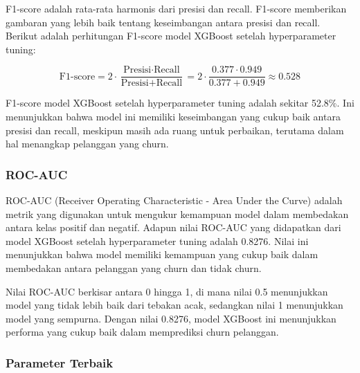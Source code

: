 F1-score adalah rata-rata harmonis dari presisi dan recall. F1-score memberikan gambaran yang lebih baik tentang keseimbangan antara presisi dan recall. Berikut adalah perhitungan F1-score model XGBoost setelah hyperparameter tuning:

\begin{equation}
    \text{F1-score} = 2 \cdot \frac{\text{Presisi} \cdot \text{Recall}}{\text{Presisi} + \text{Recall}} = 2 \cdot \frac{0.377 \cdot 0.949}{0.377 + 0.949} \approx 0.528
\end{equation}

F1-score model XGBoost setelah hyperparameter tuning adalah sekitar 52.8\%. Ini menunjukkan bahwa model ini memiliki keseimbangan yang cukup baik antara presisi dan recall, meskipun masih ada ruang untuk perbaikan, terutama dalam hal menangkap pelanggan yang churn.

\subsubsection*{ROC-AUC}

ROC-AUC (Receiver Operating Characteristic - Area Under the Curve) adalah metrik yang digunakan untuk mengukur kemampuan model dalam membedakan antara kelas positif dan negatif. Adapun nilai ROC-AUC yang didapatkan dari model XGBoost setelah hyperparameter tuning adalah 0.8276. Nilai ini menunjukkan bahwa model memiliki kemampuan yang cukup baik dalam membedakan antara pelanggan yang churn dan tidak churn.

Nilai ROC-AUC berkisar antara 0 hingga 1, di mana nilai 0.5 menunjukkan model yang tidak lebih baik dari tebakan acak, sedangkan nilai 1 menunjukkan model yang sempurna. Dengan nilai 0.8276, model XGBoost ini menunjukkan performa yang cukup baik dalam memprediksi churn pelanggan.

\subsubsection{Parameter Terbaik}


